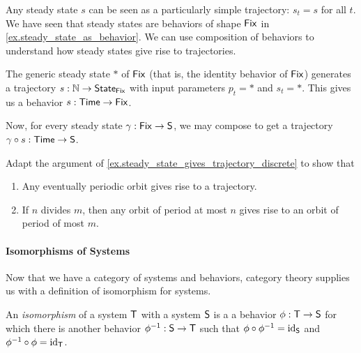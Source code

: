 \documentclass[DynamicalBook]{subfiles}
\begin{document}
{\begin{example}\label{ex.steady_state_gives_trajectory_discrete}
  Any steady state $s$ can be seen as a particularly simple trajectory: $s_t =
  s$ for all $t$. We have seen
  that steady states are behaviors of shape $\mathsf{Fix}$ in
  \cref{ex.steady_state_as_behavior}. We can use composition of behaviors to
  understand how steady states give rise to trajectories.

  The generic steady state $\ast$ of $\mathsf{Fix}$ (that is, the identity behavior of
  $\mathsf{Fix}$) generates a trajectory $s : \mathbb{N} \to \mathsf{State}_{\mathsf{Fix}}$ with input
  parameters $p_t = \ast$ and $s_t = \ast$. This gives us a behavior $s :
  \mathsf{Time} \to \mathsf{Fix}$.
  
  Now, for every steady state $\gamma : \mathsf{Fix} \to \mathsf{S}$, we may compose
  to get a trajectory $\gamma \circ s : \mathsf{Time} \to \mathsf{S}$.
\end{example}

\begin{exercise}\label{ex.behaviors_as_change_of_kind_discrete}
Adapt the argument of \cref{ex.steady_state_gives_trajectory_discrete} to show
that
\begin{enumerate}
  \item Any eventually periodic orbit gives rise to a trajectory.
  \item If $n$ divides $m$, then any orbit of period at most $n$ gives rise to
    an orbit of period of most $m$.
\end{enumerate}
\end{exercise}

\paragraph{Isomorphisms of Systems}

Now that we have a category of systems and behaviors, category theory supplies
us with a definition of isomorphism for systems. 
\begin{definition}\label{def.isomorphism_of_systems_discrete}
  An \emph{isomorphism} of a system $\mathsf{T}$ with a system $\mathsf{S}$ is a
  a behavior $\phi : \mathsf{T} \to \mathsf{S}$ for which there is another behavior
  $\phi^{-1} : \mathsf{S} \to \mathsf{T}$ such that $\phi \circ \phi ^{-1} =
  \mathrm{id}_{\mathsf{S}}$ and $\phi ^{-1} \circ \phi = \mathrm{id}_{\mathsf{T}}$.
\end{definition}

}
\end{document}
